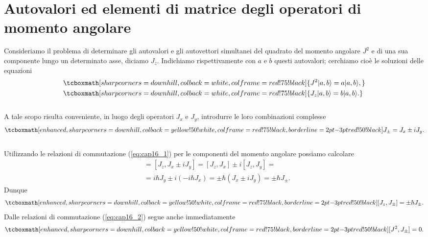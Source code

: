 \section[Autovalori ed elementi di matrice degli operatori di momento angolare]{Autovalori ed elementi di matrice degli operatori di momento angolare}
Consideriamo il problema di determinare gli autovalori e gli autovettori simultanei del quadrato del momento angolare $J^2$ e di una sua componente lungo un determinato asse, diciamo $J_z$. Indichiamo rispettivamente con $a$ e $b$ questi autovalori;  cerchiamo cioè le soluzioni delle equazioni
	\begin{align}
		&\tcboxmath[sharp corners=downhill, colback=white, colframe=red!75!black]{ J^2 \vert a, b \rangle = a \vert a, b \rangle ,} \\
		& \tcboxmath[sharp corners=downhill, colback=white, colframe=red!75!black]{J_z \vert a, b \rangle = b \vert a, b \rangle .}
	\end{align}\\
	
A tale scopo risulta conveniente, in luogo degli operatori $J_x$ e $J_y$, introdurre le loro combinazioni complesse
	\begin{equation}
		\tcboxmath[enhanced, sharp corners=downhill, colback=yellow!50!white, colframe=red!75!black, borderline={2pt}{-3pt}{red!50!black}]{
			J_{\pm} = J_x \pm i J_y .
			}
	\end{equation}\\
Utilizzando le relazioni di commutazione (\ref{eq:cap16_1}) per le componenti del momento angolare possiamo calcolare
	\begin{align}
		[J_z , J_{\pm}] & =  [J_z , J_x \pm i J_y] = [J_z , J_x] \pm i [J_z ,J_y] = \nonumber \\
		& = i\hbar J_y \pm i (-i\hbar J_x) = \pm \hbar (J_x \pm i J_y ) = \pm \hbar J_{\pm} .
	\end{align}
Dunque
	\begin{equation}
		\tcboxmath[enhanced, sharp corners=downhill, colback=yellow!50!white, colframe=red!75!black, borderline={2pt}{-3pt}{red!50!black}]{
			[J_z , J_{\pm}] = \pm \hbar J_{\pm} .
			}
	\label{eq:cap16_3}
	\end{equation}
Dalle relazioni di commutazione (\ref{eq:cap16_2}) segue anche immediatamente
	\begin{equation}
		\tcboxmath[enhanced, sharp corners=downhill, colback=yellow!50!white, colframe=red!75!black, borderline={2pt}{-3pt}{red!50!black}]{
			[J^2 , J_{\pm}]=0 .
			}
	\label{eq:cap16_4}
	\end{equation}\\
	
